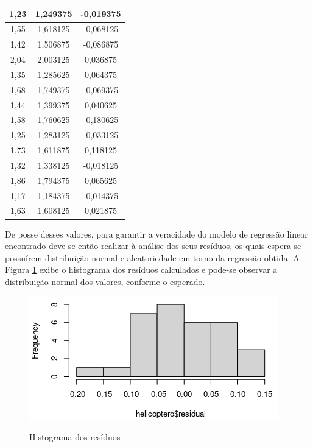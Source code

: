 \begin{table}[H]
\begin{tabular}{|c|c|c|}
  1,23           & 1,249375          & -0,019375        \\ \hline
  1,55           & 1,618125          & -0,068125        \\ \hline
  1,42           & 1,506875          & -0,086875        \\ \hline
  2,04           & 2,003125          & 0,036875         \\ \hline
  1,35           & 1,285625          & 0,064375         \\ \hline
  1,68           & 1,749375          & -0,069375        \\ \hline
  1,44           & 1,399375          & 0,040625         \\ \hline
  1,58           & 1,760625          & -0,180625        \\ \hline
  1,25           & 1,283125          & -0,033125        \\ \hline
  1,73           & 1,611875          & 0,118125         \\ \hline
  1,32           & 1,338125          & -0,018125        \\ \hline
  1,86           & 1,794375          & 0,065625         \\ \hline
  1,17           & 1,184375          & -0,014375        \\ \hline
  1,63           & 1,608125          & 0,021875         \\ \hline
  \end{tabular}
  \label{tab:residuos}
  \end{table}

De posse desses valores, para garantir a veracidade do modelo de regressão linear encontrado deve-se então realizar à análise dos seus resíduos, os quais espera-se possuírem distribuição normal e aleatoriedade em torno da regressão obtida.  A Figura \ref{fig:hist_residuals} exibe o histograma dos resíduos calculados e pode-se observar a distribuição normal dos valores, conforme o esperado.

\begin{figure}[H]
  \caption{Histograma dos resíduos}
  \center
  \includegraphics[scale=0.7]{images/hist_residuals.png}
  \label{fig:hist_residuals}
\end{figure}


